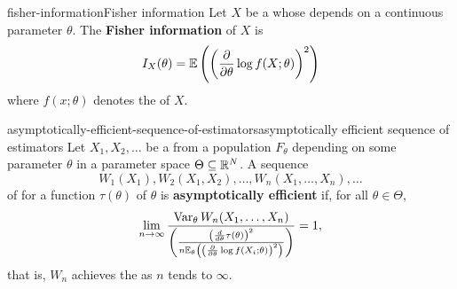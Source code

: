 \begin{topic}{fisher-information}{Fisher information}
    Let $X$ be a  whose  depends on a continuous parameter $\theta$. The \textbf{Fisher information} of $X$ is
    \[ I_X(\theta) = \mathbb{E} \left( \left( \frac{\partial}{\partial \theta} \log f(X; \theta) \right)^2 \right) \]
    where $f(x; \theta)$ denotes the  of $X$.
\end{topic}

\begin{topic}{asymptotically-efficient-sequence-of-estimators}{asymptotically efficient sequence of estimators}
    Let $X_1, X_2, \ldots$ be a  from a population $F_\theta$ depending on some parameter $\theta$ in a parameter space $\Theta \subseteq \mathbb{R}^N$. A sequence
    \[ W_1(X_1), W_2(X_1, X_2), \ldots, W_n(X_1, \ldots, X_n), \ldots \]
    of  for a function $\tau(\theta)$ of $\theta$ is \textbf{asymptotically efficient} if, for all $\theta \in \Theta$,
    \[ \lim_{n \to \infty} \frac{\operatorname{Var}_\theta W_n(X_1, \ldots, X_n)}{\left( \frac{ \left( \frac{d}{d \theta} \tau(\theta) \right)^2}{n \mathbb{E}_\theta \left( \left( \frac{\partial}{\partial \theta} \log f(X_i; \theta) \right)^2 \right) } \right)} = 1 , \]
    that is, $W_n$ achieves the  as $n$ tends to $\infty$.
\end{topic}
